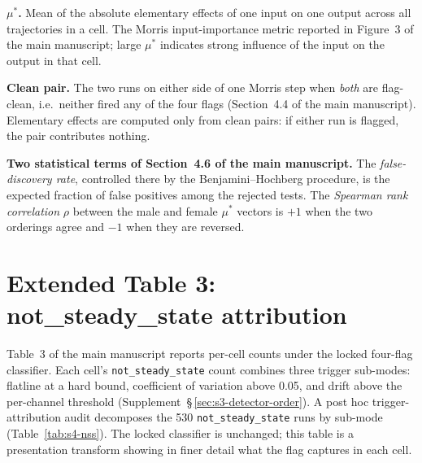 \documentclass[pdflatex,sn-nature]{sn-jnl}%
\newcommand{\mainref}[2]{#2}
\begin{document}
\textbf{$\mu^{*}$.} Mean of the absolute elementary effects of one input on one output across all trajectories in a cell. The Morris input-importance metric reported in Figure~\mainref{fig:morris}{3} of the main manuscript; large $\mu^{*}$ indicates strong influence of the input on the output in that cell.

\textbf{Clean pair.} The two runs on either side of one Morris step when \emph{both} are flag-clean, i.e.\ neither fired any of the four flags (Section~\mainref{sec:methods-detector}{4.4} of the main manuscript). Elementary effects are computed only from clean pairs: if either run is flagged, the pair contributes nothing.

\textbf{Two statistical terms of Section~\mainref{sec:methods-stats}{4.6} of the main manuscript.} The \emph{false-discovery rate}, controlled there by the Benjamini--Hochberg procedure, is the expected fraction of false positives among the rejected tests. The \emph{Spearman rank correlation} $\rho$ between the male and female $\mu^{*}$ vectors is $+1$ when the two orderings agree and $-1$ when they are reversed.




\section{Extended Table 3: not\_steady\_state attribution}\label{sec:s4}

Table~3 of the main manuscript reports per-cell counts under the locked four-flag classifier. Each cell's \texttt{not\_steady\_state} count combines three trigger sub-modes: flatline at a hard bound, coefficient of variation above 0.05, and drift above the per-channel threshold (Supplement~\S\,\ref{sec:s3-detector-order}). A post hoc trigger-attribution audit decomposes the 530 \texttt{not\_steady\_state} runs by sub-mode (Table~\ref{tab:s4-nss}). The locked classifier is unchanged; this table is a presentation transform showing in finer detail what the flag captures in each cell.
\end{document}
